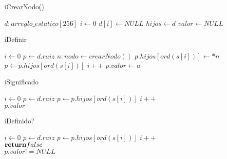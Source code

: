 \begin{algorithm}
\caption{iCrearNodo()}
\label{() -> res = nodo}
\begin{algorithmic}
\State $d : arreglo\_estatico[256]$
\State $i \gets 0$
\State $d[i] \gets NULL$
\EndWhile
\State $hijos \gets d$
\State $valor \gets NULL$
\end{algorithmic}
\end{algorithm}

\begin{algorithm}
\caption{iDefinir}
\label{inout d: diccString(alfa), in c: string, in s: alfa}
\begin{algorithmic}
\State $i \gets 0$
\State $p \gets d.raiz$
\State $n: nodo \gets crearNodo()$
\State $p.hijos[ord(s[i])] \gets *n$
\EndIf
\State $p \gets p.hijos[ord(s[i])]$
\State $i++$
\EndWhile
\State $p.valor \gets a$
\end{algorithmic}
\end{algorithm}

\begin{algorithm}
\caption{iSignificado}
\label{in d: diccString(alfa), in c: string -> res = alfa}
\begin{algorithmic}
\State $i \gets 0$
\State $p \gets d.raiz$
\State $p \gets p.hijos[ord(s[i])]$
\State $i++$
\EndWhile\\
\Return $p.valor$
\end{algorithmic}
\end{algorithm}

\begin{algorithm}
\caption{iDefinido?}
\label{in d: diccString, in c: string -> res = bool}
\begin{algorithmic}
\State $i \gets 0$
\State $p \gets d.raiz$
\State $p \gets p.hijos[ord(s[i])]$
\State $i++$
\Else \\{$\Return false$}
\EndIf
\EndWhile\\
\Return $p.valor != NULL$
\end{algorithmic}
\end{algorithm}


